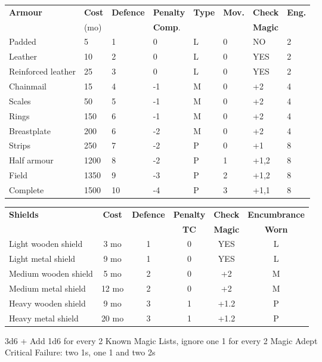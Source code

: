 \documentclass[landscape,10pt,a4paper]{article}
\begin{document}
\begin{multicols}{2}
\begin{dmbox}[title=Armour - page \pageref{equipmentarmour}]
\begin{tabular}{llllllll}
\textbf{Armour} & \textbf{Cost} & \textbf{Defence} & \textbf{Penalty} & \textbf{Type} & \textbf{Mov.} & \textbf{Check}&\textbf{Eng.}\\
&(mo)&&\textbf{Comp}.&&&\textbf{Magic}&\\
\hline
Padded & 5 & 1 & 0 & L & 0 & NO&2\\
Leather & 10 & 2 & 0 & L & 0 & YES&2\\
Reinforced leather& 25 & 3 & 0 & L & 0 & YES&2\\
Chainmail & 15 & 4 & -1 & M & 0 &+2&4\\
Scales& 50 & 5 & -1 & M & 0 &+2&4\\
Rings & 150 & 6 & -1 & M & 0 &+2&4\\
Breastplate & 200 & 6 & -2 & M & 0 &+2&4\\
Strips & 250 & 7 & -2 & P & 0 &+1&8\\
Half armour & 1200 & 8 & -2 & P & 1 &+1,2&8\\
Field & 1350 & 9 & -3 & P & 2 &+1,2&8\\
Complete & 1500 & 10 & -4 & P & 3 &+1,1&8\\
\end{tabular}
\end{dmbox}

\begin{dmbox}[title=Shields - page \pageref{shield-table}]
\begin{tabular}{lccccc}
\textbf{Shields} & \textbf{Cost} & \textbf{Defence} & \textbf{Penalty} & \textbf{Check} & \textbf{Encumbrance}\\
&&&\textbf{TC}&\textbf{Magic}&\textbf{Worn}\\
\hline
Light wooden shield & 3 mo & 1& 0& YES & L\\
Light metal shield & 9 mo & 1& 0& YES & L\\
Medium wooden shield &5 mo & 2& 0& +2& M\\
Medium metal shield &12 mo & 2 & 0& +2 & M\\
Heavy wooden shield & 9 mo & 3 & 1& +1.2 & P\\
Heavy metal shield & 20 mo & 3& 1& +1.2 & P\\
\end{tabular}
\end{dmbox}

\begin{dmbox}[title=Magic Check - page \pageref{magieprovadimagia}]
3d6 + Add 1d6 for every 2 Known Magic Lists, ignore one 1 for every 2 Magic Adept\\
Critical Failure: two 1s, one 1 and two 2s
\end{dmbox}


\end{multicols}
\end{document}
